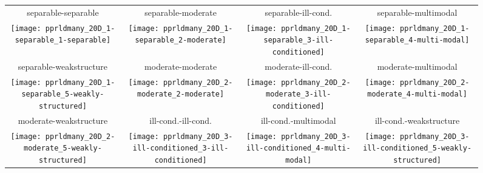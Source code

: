\documentclass[sigconf]{acmart}
\begin{document}



\begin{figure*}
\begin{tabular}{@{\hspace*{-0.009\textwidth}}c@{\hspace*{-0.014\textwidth}}c@{\hspace*{-0.016\textwidth}}c@{\hspace*{-0.02\textwidth}}c}
separable-separable & separable-moderate & separable-ill-cond. & separable-multimodal\\
\texttt{[image: pprldmany\_20D\_1-separable\_1-separable]} &
\texttt{[image: pprldmany\_20D\_1-separable\_2-moderate]} &
\texttt{[image: pprldmany\_20D\_1-separable\_3-ill-conditioned]} &
\texttt{[image: pprldmany\_20D\_1-separable\_4-multi-modal]}\\
separable-weakstructure & moderate-moderate & moderate-ill-cond. & moderate-multimodal\\
\texttt{[image: pprldmany\_20D\_1-separable\_5-weakly-structured]} &
\texttt{[image: pprldmany\_20D\_2-moderate\_2-moderate]} &
\texttt{[image: pprldmany\_20D\_2-moderate\_3-ill-conditioned]} &
\texttt{[image: pprldmany\_20D\_2-moderate\_4-multi-modal]}\\
moderate-weakstructure & ill-cond.-ill-cond. & ill-cond.-multimodal & ill-cond.-weakstructure\\
\texttt{[image: pprldmany\_20D\_2-moderate\_5-weakly-structured]} &
\texttt{[image: pprldmany\_20D\_3-ill-conditioned\_3-ill-conditioned]} &
\texttt{[image: pprldmany\_20D\_3-ill-conditioned\_4-multi-modal]} &
\texttt{[image: pprldmany\_20D\_3-ill-conditioned\_5-weakly-structured]} \\

\end{tabular}
\end{figure*}
\end{document}
